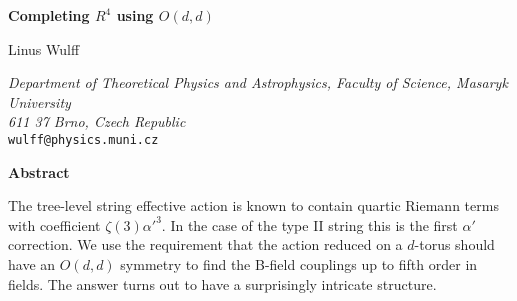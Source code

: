 \documentclass[a4paper,11pt]{article}
\begin{document}
\setcounter{page}{0}

\hfill%
\vspace{30pt}

\begin{center}
{\huge{\bf {Completing $R^4$ using $O(d,d)$}}}

\vspace{80pt}

Linus Wulff

\vspace{15pt}

\small {\it Department of Theoretical Physics and Astrophysics, Faculty of Science, Masaryk University\\ 611 37 Brno, Czech Republic}
\\
\vspace{12pt}
\texttt{wulff@physics.muni.cz}\\

\vspace{80pt}

{\bf Abstract}
\end{center}
\noindent
The tree-level string effective action is known to contain quartic Riemann terms with coefficient $\zeta(3)\alpha'^3$. In the case of the type II string this is the first $\alpha'$ correction. We use the requirement that the action reduced on a $d$-torus should have an $O(d,d)$ symmetry to find the B-field couplings up to fifth order in fields. The answer turns out to have a surprisingly intricate structure.

\clearpage
\tableofcontents

\end{document}
